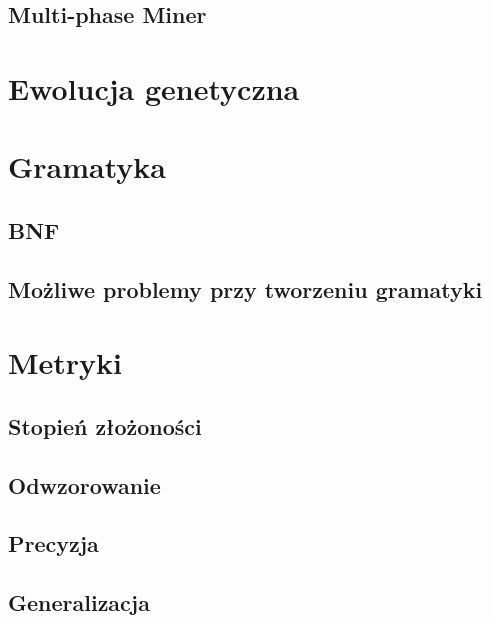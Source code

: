 \subsection{Multi-phase Miner}


\section{Ewolucja genetyczna}
\label{sec:ewolucjaGenetyczne}



\section{Gramatyka}
\label{sec:gramatyka}
\subsection{BNF}
\subsection{Możliwe problemy przy tworzeniu gramatyki}


\section{Metryki}
\label{sec:metryki}
\subsection{Stopień złożoności}
\subsection{Odwzorowanie}
\subsection{Precyzja}
\subsection{Generalizacja}


